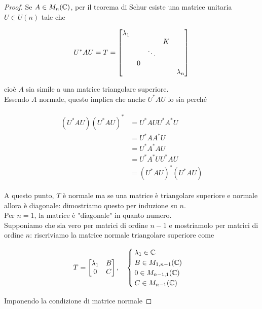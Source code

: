 \begin{proof}
	Se $ A \in M_{n}(\mathbb{C}) $, per il teorema di Schur esiste una matrice unitaria $ U \in U(n) $ tale che
	
	\begin{equation}
		U^{*} A U = T = %
		\bmqty{ %
				\dmat{ %
						\lambda_{1},
						& & K \\ & \ddots & \\ 0 & & ,
						\lambda_{n}
						}
				}
	\end{equation}

	cioè $ A $ sia simile a una matrice triangolare superiore.\\
	Essendo $ A $ normale, questo implica che anche $ U^{*} A U $ lo sia perché
	
	\begin{align}
		\begin{split}
			(U^{*} A U) (U^{*} A U)^{*} &= U^{*} A U U^{*} A^{*} U \\
			&= U^{*} A A^{*} U \\
			&= U^{*} A^{*} A U \\
			&= U^{*} A^{*} U U^{*} A U \\
			&= (U^{*} A U)^{*} (U^{*} A U)
		\end{split}
	\end{align}

	A questo punto, $ T $ è normale ma se una matrice è triangolare superiore e normale allora è diagonale: dimostriamo questo per induzione su $ n $.\\
	Per $ n=1 $, la matrice è "diagonale" in quanto numero.\\
	Supponiamo che sia vero per matrici di ordine $ n-1 $ e mostriamolo per matrici di ordine $ n $: riscriviamo la matrice normale triangolare superiore come
	
	\begin{equation}
		T = \bmqty{ \lambda_{1} & B \\ 0 & C } %
		\qcomma %
		\begin{cases}
			\lambda_{1} \in \C \\
			B \in M_{1,n-1}(\C) \\
			0 \in M_{n-1,1}(\C) \\
			C \in M_{n-1}(\C)
		\end{cases}
	\end{equation}

	Imponendo la condizione di matrice normale
	

\end{proof}
